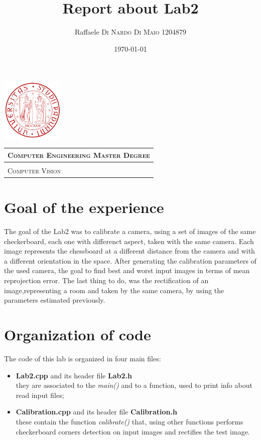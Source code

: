\documentclass{article}
\title{\textbf{Report about Lab2}} %
\author{Raffaele \textsc{Di Nardo Di Maio} 1204879} %
\date{\today}
\begin{document}
\begin{minipage}{.20\textwidth}
  \includegraphics[height=3cm]{../Icon4}
\end{minipage}\begin{minipage}{.20\textwidth}
  \begin{table}[H]
  \begin{tabular}{l}
  \scshape{\Large{Computer Engineering Master Degree}} \\
  \hline \\
  \scshape{\Large{Computer Vision}} \\
  \end{tabular}
  \end{table}
\end{minipage}
{\let\newpage\relax\maketitle}
\section{Goal of the experience}
The goal of the Lab2 was to calibrate a camera, using a set of images of the same checkerboard, each one with differenct aspect, taken with the same camera. Each image represents the chessboard at a different distance from the camera and with a different orientation in the space. After generating the calibration parameters of the used camera, the goal to find best and worst input images in terms of mean reprojection error. The last thing to do, was the rectification of an image,representing a room and taken by the same camera, by using the parameters estimated previously.
\section{Organization of code}
The code of this lab is organized in four main files:
\begin{itemize}
\item{\textbf{Lab2.cpp} and its header file \textbf{Lab2.h}\\
they are associated to the \textit{main()} and to a function, used to print info about read input files;}
\item{\textbf{Calibration.cpp} and its header file \textbf{Calibration.h}\\
these contain the function \textit{calibrate()} that, using other functions performs checkerboard corners detection on input images and rectifies the test image.}
\end{itemize}
\end{document}
